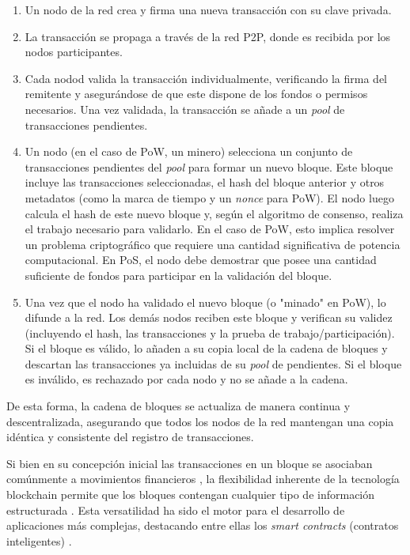 \begin{enumerate}
    \item Un nodo de la red crea y firma una nueva transacción con su clave privada.
    \item La transacción se propaga a través de la red P2P, donde es recibida por los nodos participantes.
    \item Cada nodod valida la transacción individualmente, verificando la firma del remitente y asegurándose de que este dispone de los fondos o permisos necesarios. Una vez validada, la transacción se añade a un \textit{pool} de transacciones pendientes.
    \item Un nodo (en el caso de PoW, un minero) selecciona un conjunto de transacciones pendientes del \textit{pool} para formar un nuevo bloque. Este bloque incluye las transacciones seleccionadas, el hash del bloque anterior y otros metadatos (como la marca de tiempo y un \textit{nonce} para PoW). El nodo luego calcula el hash de este nuevo bloque y, según el algoritmo de consenso, realiza el trabajo necesario para validarlo. En el caso de PoW, esto implica resolver un problema criptográfico que requiere una cantidad significativa de potencia computacional. En PoS, el nodo debe demostrar que posee una cantidad suficiente de fondos para participar en la validación del bloque.
    \item Una vez que el nodo ha validado el nuevo bloque (o "minado" en PoW), lo difunde a la red. Los demás nodos reciben este bloque y verifican su validez (incluyendo el hash, las transacciones y la prueba de trabajo/participación). Si el bloque es válido, lo añaden a su copia local de la cadena de bloques y descartan las transacciones ya incluidas de su \textit{pool} de pendientes. Si el bloque es inválido, es rechazado por cada nodo y no se añade a la cadena.
\end{enumerate}

De esta forma, la cadena de bloques se actualiza de manera continua y descentralizada, asegurando que todos los nodos de la red mantengan una copia idéntica y consistente del registro de transacciones.

Si bien en su concepción inicial las transacciones en un bloque se asociaban comúnmente a movimientos financieros \cite{satoshi2008bitcoin}, la flexibilidad inherente de la tecnología blockchain permite que los bloques contengan cualquier tipo de información estructurada \cite{bartolomeo2020introduccion}. Esta versatilidad ha sido el motor para el desarrollo de aplicaciones más complejas, destacando entre ellas los \textit{smart contracts} (contratos inteligentes) \cite{sunny2022systematic}.

